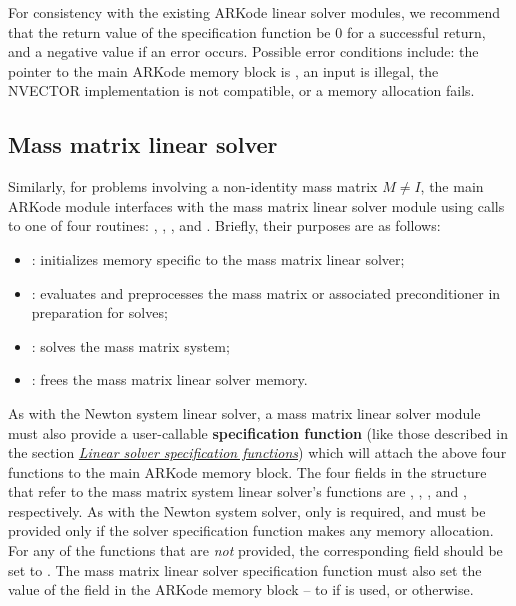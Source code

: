 \documentclass[letterpaper,10pt,english]{sphinxmanual}
\begin{document}
For consistency with the existing ARKode linear solver modules, we
recommend that the return value of the specification function be 0 for
a successful return, and a negative value if an error occurs.
Possible error conditions include: the pointer to the main ARKode
memory block is , an input is illegal, the NVECTOR
implementation is not compatible, or a memory allocation fails.


\subsection{Mass matrix linear solver}
\label{linear_solvers/custom:mass-matrix-linear-solver}
Similarly, for problems involving a non-identity mass matrix
$M\ne I$, the main ARKode module interfaces with the mass matrix
linear solver module using calls to one of four routines:
{\hyperref[linear_solvers/custom:minit]{}}, {\hyperref[linear_solvers/custom:msetup]{}}, {\hyperref[linear_solvers/custom:msolve]{}}, and
{\hyperref[linear_solvers/custom:mfree]{}}. Briefly, their purposes are as follows:
\begin{itemize}
\item {} 
{\hyperref[linear_solvers/custom:minit]{}}: initializes memory specific to the mass matrix
linear solver;

\item {} 
{\hyperref[linear_solvers/custom:msetup]{}}: evaluates and preprocesses the mass matrix or
associated preconditioner in preparation for solves;

\item {} 
{\hyperref[linear_solvers/custom:msolve]{}}: solves the mass matrix system;

\item {} 
{\hyperref[linear_solvers/custom:mfree]{}}: frees the mass matrix linear solver memory.

\end{itemize}

As with the Newton system linear solver, a mass matrix linear solver
module must also provide a user-callable \textbf{specification function} (like
those described in the section {\hyperref[c_interface/User_callable:cinterface-linearsolvers]{\emph{Linear solver specification functions}}}) which
will attach the above four functions to the main ARKode memory
block.  The four fields in the  structure that refer to
the mass matrix system linear solver's functions are ,
, , and , respectively.  As
with the Newton system solver, only {\hyperref[linear_solvers/custom:msolve]{}} is required,
and {\hyperref[linear_solvers/custom:mfree]{}} must be provided only if the solver
specification function makes any memory allocation.  For any of the
functions that are \emph{not} provided, the corresponding field should be
set to .  The mass matrix linear solver specification function
must also set the value of the field  in the
ARKode memory block -- to  if {\hyperref[linear_solvers/custom:msetup]{}} is used, or
 otherwise.
\end{document}
